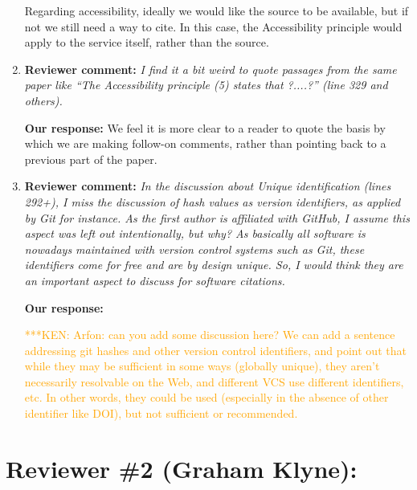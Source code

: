 \documentclass{article}
\newcommand{\niemnote}[1]{ {\textcolor{orange} { ***KEN: #1 }}} %
\begin{document}
\begin{enumerate}
Regarding accessibility, ideally we would like the source to be available, but if not we still need a way to cite.
In this case, the Accessibility principle would apply to the service itself, rather than the source.


\item \textbf{Reviewer comment:}
\emph{I find it a bit weird to quote passages from the same paper like ``The Accessibility principle (5) states that ?....?'' (line 329 and others).}

\textbf{Our response:}
We feel it is more clear to a reader to quote the basis by which we are making follow-on comments, rather than pointing back to a previous part of the paper.


\item \textbf{Reviewer comment:}
\emph{In the discussion about Unique identification (lines 292+), I miss the discussion of hash values as version identifiers, as applied by Git for instance. As the first author is affiliated with GitHub, I assume this aspect was left out intentionally, but why? As basically all software is nowadays maintained with version control systems such as Git, these identifiers come for free and are by design unique. So, I would think they are an important aspect to discuss for software citations.}

\textbf{Our response:}

\niemnote{Arfon: can you add some discussion here? We can add a sentence addressing git hashes and other version control identifiers, and point out that while they may be sufficient in some ways (globally unique), they aren't necessarily resolvable on the Web, and different VCS use different identifiers, etc. In other words, they could be used (especially in the absence of other identifier like DOI), but not sufficient or recommended.}

\end{enumerate}

\section*{Reviewer \#2 (Graham Klyne):}
\end{document}
